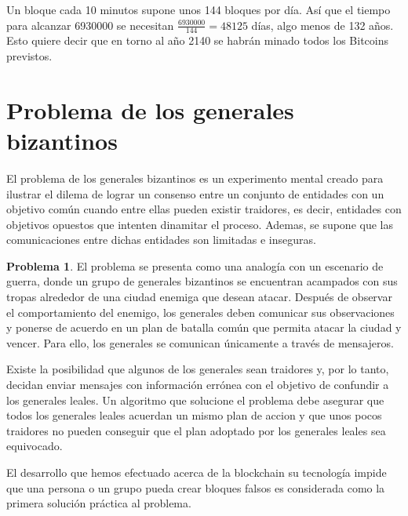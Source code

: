 \documentclass[twoside]{article}
\theoremstyle{definition}
\newtheorem{problem}[teorema]{Problema}
\begin{document}
Un bloque cada 10 minutos supone unos 144 bloques por día. Así que el tiempo para alcanzar 6930000 se necesitan $\frac{6930000}{144} = 48125$ días, algo menos de 132 años. Esto quiere decir que en torno al año 2140 se habrán minado todos los Bitcoins previstos.





\vspace{5cm}

\newpage
\section{Problema de los generales bizantinos}
El problema de los generales bizantinos es un experimento mental creado para ilustrar el dilema de lograr un consenso entre un conjunto de entidades con un objetivo común cuando entre ellas pueden existir traidores, es decir, entidades con objetivos opuestos que intenten dinamitar el proceso. Ademas, se supone que las comunicaciones entre dichas entidades son limitadas e inseguras. 
\begin{problem}
El problema se presenta como una analogía con un escenario de guerra, donde un grupo de generales bizantinos se encuentran acampados con sus tropas alrededor de una ciudad enemiga que desean atacar. Después de observar el comportamiento del enemigo, los generales deben comunicar sus observaciones y ponerse de acuerdo en un plan de batalla común que permita atacar la ciudad y vencer. Para ello, los generales se comunican únicamente a través de mensajeros. 

Existe la posibilidad que algunos de los generales sean traidores y, por lo tanto, decidan enviar mensajes con información errónea con el objetivo de confundir a los generales leales. Un algoritmo que solucione el problema debe asegurar que todos los generales leales acuerdan un mismo plan de accion y que unos pocos traidores no pueden conseguir que el plan adoptado por los generales leales sea equivocado.
\end{problem}
El desarrollo que hemos efectuado acerca de la blockchain su tecnología impide que una persona o un grupo pueda crear bloques falsos es considerada como la primera solución práctica al problema.
\end{document}

